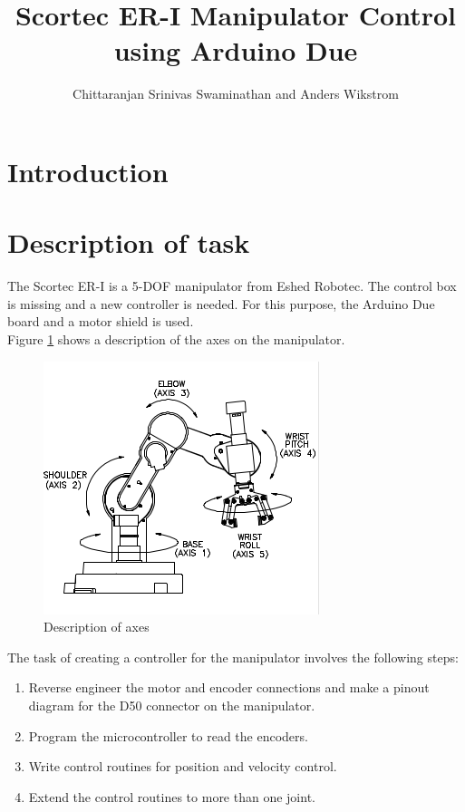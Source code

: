\documentclass[10pt,a4paper]{article}
\author{Chittaranjan Srinivas Swaminathan and Anders Wikstrom}
\title{Scortec ER-I Manipulator Control using Arduino Due}
\begin{document}
\maketitle
\tableofcontents
\section{Introduction}

\section{Description of task}
The Scortec ER-I is a 5-DOF manipulator from Eshed Robotec. The
control box is missing and a new controller is needed. For this
purpose, the Arduino Due board and a motor shield is used. \\

Figure \ref{fig:axes} shows a description of the axes on the manipulator.

\begin{figure}[H]
    \centering
    \includegraphics{axes.png}
    \caption{Description of axes}
    \label{fig:axes}
\end{figure}

The task of creating a controller for the manipulator involves the
following steps:
\begin{enumerate}
\item Reverse engineer the motor and encoder connections and make a
  pinout diagram for the D50 connector on the manipulator.
\item Program the microcontroller to read the encoders.
\item Write control routines for position and velocity control.
\item Extend the control routines to more than one joint.
\end{enumerate}
\end{document}
